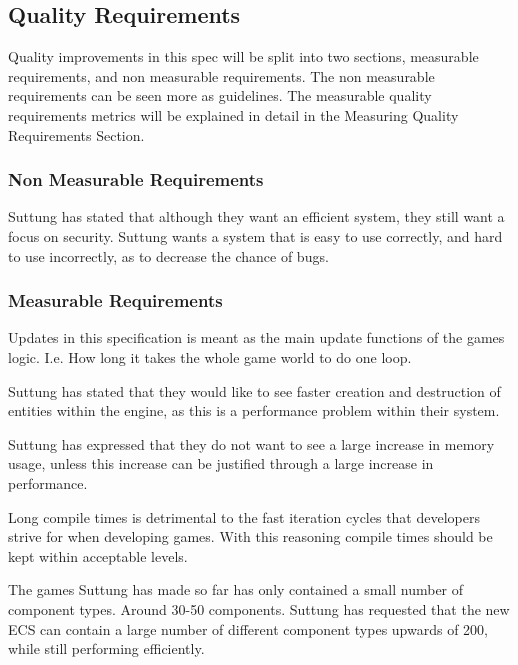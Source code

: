 \subsection*{Quality Requirements}
Quality improvements in this spec will be split into two sections,
measurable requirements, and non measurable requirements.
The non measurable requirements can be seen more as guidelines. 
The measurable quality requirements metrics will be explained in detail in the Measuring Quality Requirements Section.

\subsubsection*{Non Measurable Requirements}
Suttung has stated that although they want an efficient system, they still want a focus on security.
Suttung wants a system that is easy to use correctly, and hard to use incorrectly, as to decrease the chance of bugs.

\subsubsection*{Measurable Requirements}
Updates in this specification is meant as the main update functions of the games logic.
I.e. How long it takes the whole game world to do one loop.

Suttung has stated that they would like to see faster creation and destruction of entities within the engine, 
as this is a performance problem within their system.

Suttung has expressed that they do not want to see a large increase in memory usage, 
unless this increase can be justified through a large increase in performance.

Long compile times is detrimental to the fast iteration cycles that developers strive for when developing games.
With this reasoning compile times should be kept within acceptable levels.

The games Suttung has made so far has only contained a small number of component types. Around 30-50 components.
Suttung has requested that the new ECS can contain a large number of different component types upwards of 200, 
while still performing efficiently. 